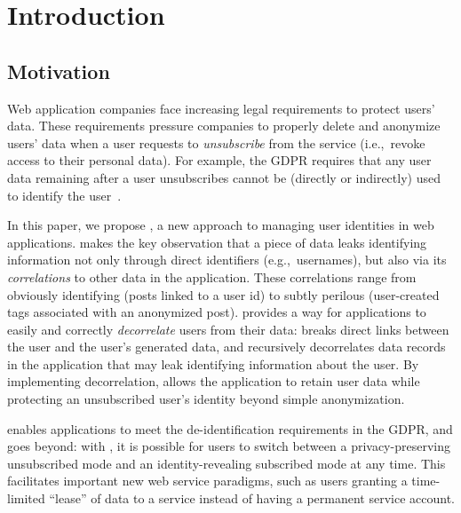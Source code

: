 \section{Introduction}

\subsection{Motivation} 

Web application companies face increasing legal requirements to protect users’ data. These
requirements pressure companies to properly delete and anonymize users' data when a user requests to
\emph{unsubscribe} from the service (i.e.,\ revoke access to their personal data). For example, the
GDPR requires that any user data remaining after a user unsubscribes cannot be (directly or
indirectly) used to identify the user~\cite{gdpr}.  

In this paper, we propose \sys{}, a new approach to managing user identities in web applications.
\sys{} makes the key observation that a piece of data leaks identifying information not only through
direct identifiers (e.g.,\ usernames), but also via its \emph{correlations} to other data in the
application.  These correlations range from obviously identifying (posts linked to a user id) to
subtly perilous (user-created tags associated with an anonymized post). \sys{} provides a way for
applications to easily and correctly \emph{decorrelate} users from their data: \sys{} breaks direct
links between the user and the user's generated data, and recursively decorrelates data records in
the application that may leak identifying information about the user.  By implementing
decorrelation, \sys{} allows the application to retain user data while protecting an unsubscribed
user's identity beyond simple anonymization.

\sys{} enables applications to meet the de-identification requirements in the GDPR, and goes beyond:
with \sys{}, it is possible for users to switch between a privacy-preserving unsubscribed mode and
an identity-revealing subscribed mode at any time. This facilitates important new web service
paradigms, such as users granting a time-limited ``lease'' of data to a service instead of having a
permanent service account.

